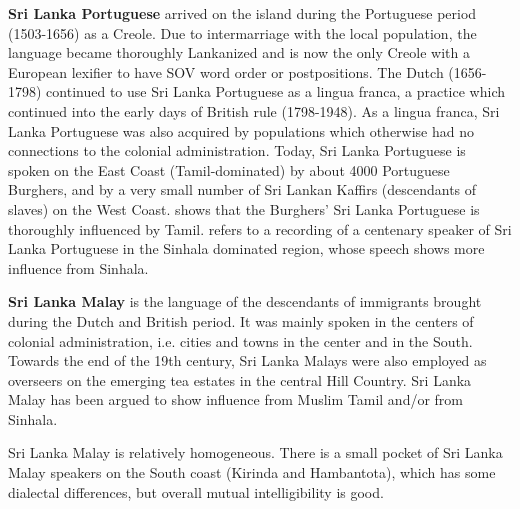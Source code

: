 \documentclass[handout,utf8]{article}
\begin{document}
\textbf{Sri Lanka Portuguese} arrived on the island during the Portuguese period (1503-1656) as a Creole. Due to intermarriage with the local population, the language became thoroughly Lankanized and is now the only Creole with a European lexifier to have SOV word order or postpositions. The Dutch (1656-1798) continued to use Sri Lanka Portuguese as a lingua franca, a practice which continued into the early days of British rule (1798-1948). As a lingua franca, Sri Lanka Portuguese was also acquired by populations which otherwise had no connections to the colonial administration. Today, Sri Lanka Portuguese is spoken on the East Coast (Tamil-dominated) by about 4000 Portuguese Burghers, and by a very small number of Sri Lankan Kaffirs (descendants of slaves) on the West Coast. \citet{Smith} shows that the Burghers' Sri Lanka Portuguese is thoroughly influenced by Tamil. \citet{Hettiaratchi} refers to a recording of a centenary speaker of Sri Lanka Portuguese in the Sinhala dominated region, whose speech shows 
more influence from Sinhala. 


\textbf{Sri Lanka Malay} is the language of the descendants of immigrants brought during the Dutch and British period. It was mainly spoken in the centers of colonial administration, i.e. cities and towns in the center and in the South. Towards the end of the 19th century, Sri Lanka Malays were also employed as overseers on the emerging tea estates in the central Hill Country. Sri Lanka Malay has been argued to show influence from Muslim Tamil and/or from Sinhala. 

Sri Lanka Malay is relatively homogeneous. There is a small pocket of Sri Lanka Malay speakers on the South coast (Kirinda and Hambantota), which has some dialectal differences, but overall mutual intelligibility is good. 

\end{document}
